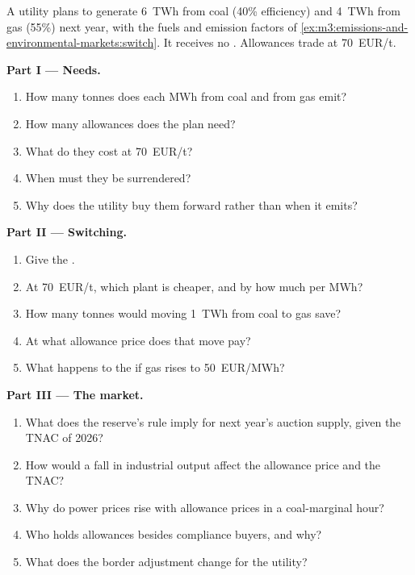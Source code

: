\begin{problem}\label{pb:m3:emissions-and-environmental-markets:1}
A utility plans to generate 6~TWh from coal (40\% efficiency) and 4~TWh from gas (55\%) next year,
with the fuels and emission factors of \cref{ex:m3:emissions-and-environmental-markets:switch}. It
receives no . Allowances trade at \qty{70}{EUR/t}.

\medskip\noindent\textbf{Part I --- Needs.}
\begin{enumerate}
\item How many tonnes does each MWh from coal and from gas emit?
\item How many allowances does the plan need?
\item What do they cost at \qty{70}{EUR/t}?
\item When must they be surrendered?
\item Why does the utility buy them forward rather than when it emits?
\end{enumerate}

\medskip\noindent\textbf{Part II --- Switching.}
\begin{enumerate}[resume]
\item Give the .
\item At \qty{70}{EUR/t}, which plant is cheaper, and by how much per MWh?
\item How many tonnes would moving 1~TWh from coal to gas save?
\item At what allowance price does that move pay?
\item What happens to the  if gas rises to \qty{50}{EUR/MWh}?
\end{enumerate}

\medskip\noindent\textbf{Part III --- The market.}
\begin{enumerate}[resume]
\item What does the reserve's rule imply for next year's auction supply, given the TNAC of 2026?
\item How would a fall in industrial output affect the allowance price and the TNAC?
\item Why do power prices rise with allowance prices in a coal-marginal hour?
\item Who holds allowances besides compliance buyers, and why?
\item What does the border adjustment change for the utility?
\end{enumerate}


\end{problem}
